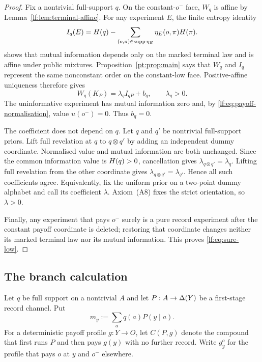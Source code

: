 \begin{proof}
Fix a nontrivial full-support $q$.  On the constant-$o^-$ face, $W_q$ is
affine by Lemma~\ref{lf:lem:terminal-affine}.  For any experiment $E$, the
finite entropy identity
\begin{equation}
I_q(E)=H(q)-\sum_{(o,\pi)\in\operatorname{supp}\eta_E}
\eta_E(o,\pi)H(\pi).
\label{lf:eq:posterior-entropy}
\end{equation}
shows that mutual information depends only on the marked terminal law and is
affine under public mixtures.  Proposition~\ref{pt:prop:main} says that $W_q$ and
$I_q$ represent the same nonconstant order on the constant-low face.
Positive-affine uniqueness therefore gives
\[
W_q(K_P)=\lambda_q I_{qP}+b_q,
\qquad \lambda_q>0.
\]
The uninformative experiment has mutual information zero and, by
\eqref{lf:eq:payoff-normalisation}, value $u(o^-)=0$.  Thus $b_q=0$.

The coefficient does not depend on $q$.  Let $q$ and $q'$ be nontrivial
full-support priors.  Lift full revelation at $q$ to $q\otimes q'$ by adding an
independent dummy coordinate.  Normalised value and mutual information are both
unchanged.  Since the common information value is $H(q)>0$, cancellation
gives $\lambda_{q\otimes q'}=\lambda_q$.  Lifting full revelation from the
other coordinate gives $\lambda_{q\otimes q'}=\lambda_{q'}$.  Hence all such
coefficients agree.  Equivalently, fix the uniform prior on a two-point dummy
alphabet and call its coefficient $\lambda$.  Axiom~\textup{(A8)} fixes the
strict orientation, so $\lambda>0$.

Finally, any experiment that pays $o^-$ surely is a pure record experiment
after the constant payoff coordinate is deleted; restoring that coordinate
changes neither its marked terminal law nor its mutual information.  This
proves \eqref{lf:eq:sure-low}.
\end{proof}

\subsection{The branch calculation}

Let $q$ be full support on a nontrivial $A$ and let
$P:A\to\Delta(Y)$ be a first-stage record channel.  Put
\[
m_y:=\sum_a q(a)P(y\mid a).
\]
For a deterministic payoff profile $g:Y\to O$, let $C(P,g)$ denote the
compound that first runs $P$ and then pays $g(y)$ with no further record.
Write $g_y^o$ for the profile that pays $o$ at $y$ and $o^-$ elsewhere.

